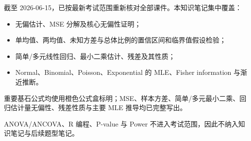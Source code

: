 \documentclass[11pt,a4paper]{article}
\theoremstyle{definition}
\theoremstyle{plain}
\theoremstyle{remark}
\begin{document}
截至 2026-06-15，已按最新考试范围重新核对全部课件。本知识笔记集中覆盖：
\begin{itemize}
    \item 无偏估计、MSE 分解及核心无偏性证明；
    \item 单均值、两均值、未知方差与总体比例的置信区间和临界值假设检验；
    \item 简单/多元线性回归、最小二乘估计、残差及其性质；
    \item Normal、Binomial、Poisson、Exponential 的 MLE、Fisher information 与渐近推断。
\end{itemize}

重要基石公式均使用橙色公式盒标明；MSE、样本方差、简单/多元最小二乘、回归估计量无偏性、残差性质与主要 MLE 推导均已完整写出。

\begin{warnbox}[不纳入后续笔记范围]
ANOVA/ANCOVA、R 编程、P-value 与 Power 不进入考试范围，因此不纳入知识笔记与后续题型笔记。
\end{warnbox}
\end{document}
